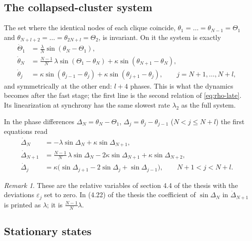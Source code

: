 \documentclass[a4paper,11pt]{article}
\theoremstyle{remark}
\newtheorem{remark}{Remark}
\begin{document}
\subsection{The collapsed-cluster system}

The set where the identical nodes of each clique coincide,
$\theta_1=\dots=\theta_{N-1}=\Theta_1$ and
$\theta_{N+l+2}=\dots=\theta_{2N+l}=\Theta_2$, is invariant. On it the system
is exactly
\begin{equation}\label{eq:collapsed}
\begin{aligned}
\dot\Theta_1&=\frac\lambda N\sin(\theta_N-\Theta_1),\\
\dot\theta_N&=\frac{N-1}{N}\,\lambda\sin(\Theta_1-\theta_N)+\kappa\sin(\theta_{N+1}-\theta_N),\\
\dot\theta_j&=\kappa\sin(\theta_{j-1}-\theta_j)+\kappa\sin(\theta_{j+1}-\theta_j),
\qquad j=N+1,\dots,N+l,
\end{aligned}
\end{equation}
and symmetrically at the other end: $l+4$ phases. This is what the dynamics
becomes after the fast stage; the first line is the second relation of
\eqref{eq:rho-late}. Its linearization at synchrony has the same slowest rate
$\lambda_2$ as the full system.

In the phase differences $\Delta_N=\theta_N-\Theta_1$,
$\Delta_j=\theta_j-\theta_{j-1}$ ($N<j\le N+l$) the first equations read
\begin{equation}\label{eq:relative}
\begin{aligned}
\dot\Delta_N&=-\lambda\sin\Delta_N+\kappa\sin\Delta_{N+1},\\
\dot\Delta_{N+1}&=\frac{N-1}{N}\,\lambda\sin\Delta_N-2\kappa\sin\Delta_{N+1}+\kappa\sin\Delta_{N+2},\\
\dot\Delta_j&=\kappa\bigl(\sin\Delta_{j+1}-2\sin\Delta_j+\sin\Delta_{j-1}\bigr),
\qquad N+1<j<N+l .
\end{aligned}
\end{equation}

\begin{remark}
These are the relative variables of section 4.4 of the thesis with the
deviations $\varepsilon_j$ set to zero. In (4.22) of the thesis the coefficient
of $\sin\Delta_N$ in $\dot\Delta_{N+1}$ is printed as $\lambda$; it is
$\frac{N-1}{N}\lambda$.
\end{remark}

\subsection{Stationary states}
\end{document}
